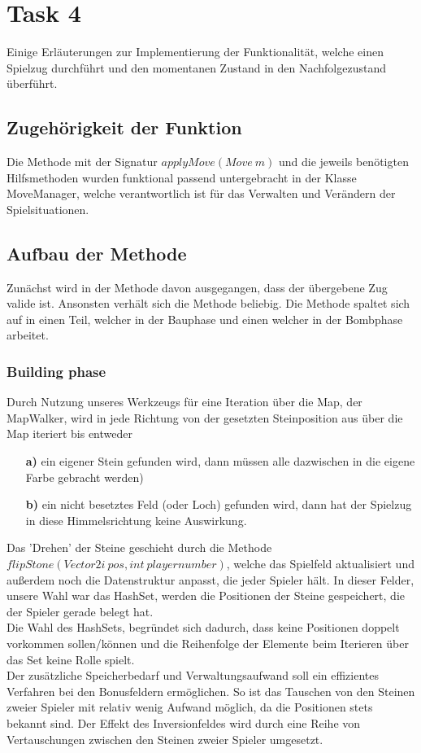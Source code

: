\section{Task 4}
Einige Erläuterungen zur Implementierung der Funktionalität, welche einen Spielzug durchführt und den momentanen Zustand in den Nachfolgezustand überführt.
\subsection{Zugehörigkeit der Funktion}
Die Methode mit der Signatur $applyMove(Move\ m)$ und die jeweils benötigten Hilfsmethoden wurden funktional passend untergebracht in der Klasse MoveManager, welche verantwortlich ist für das Verwalten und Verändern der Spielsituationen.
\subsection{Aufbau der Methode}
Zunächst wird in der Methode davon ausgegangen, dass der übergebene Zug valide ist. Ansonsten verhält sich die Methode beliebig.
Die Methode spaltet sich auf in einen Teil, welcher in der Bauphase und einen welcher in der Bombphase arbeitet.
\subsubsection{Building phase}
Durch Nutzung unseres Werkzeugs für eine Iteration über die Map, der MapWalker, wird in jede Richtung von der gesetzten Steinposition aus über die Map iteriert bis entweder
\begin{enumerate}
\item[\textbf{a)}] ein eigener Stein gefunden wird, dann müssen alle dazwischen in die eigene Farbe gebracht werden) 
\item[\textbf{b)}] ein nicht besetztes Feld (oder Loch) gefunden wird, dann hat der Spielzug in diese Himmelsrichtung keine Auswirkung.
\end{enumerate}
Das 'Drehen' der Steine geschieht durch die Methode\\ $flipStone(Vector2i\ pos, int\ playernumber)$, welche das Spielfeld aktualisiert und außerdem noch die Datenstruktur anpasst, die jeder Spieler hält. In dieser Felder, unsere Wahl war das HashSet, werden die Positionen der Steine gespeichert, die der Spieler gerade belegt hat.\\
Die Wahl des HashSets, begründet sich dadurch, dass keine Positionen doppelt vorkommen sollen/können und die Reihenfolge der Elemente beim Iterieren über das Set keine Rolle spielt.\\
Der zusätzliche Speicherbedarf und Verwaltungsaufwand soll ein effizientes Verfahren bei den Bonusfeldern ermöglichen.
So ist das Tauschen von den Steinen zweier Spieler mit relativ wenig Aufwand möglich, da die Positionen stets bekannt sind. Der Effekt des Inversionfeldes wird durch eine Reihe von Vertauschungen zwischen den Steinen zweier Spieler umgesetzt.
